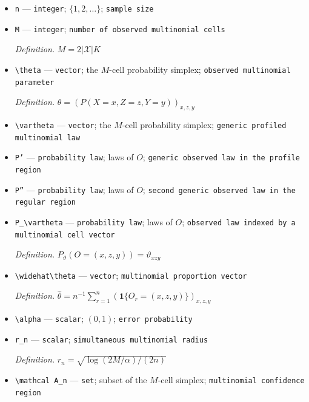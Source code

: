 \documentclass{article}
\begin{document}
\begin{itemize}
  \par\smallskip\noindent\emph{Definition.} \(H_\tau(v)=-A^2/v^2+B^2/(1-\tau-v)^2+2(v+\tau-D_0)/\tau-1\)
  \item \texttt{n} --- \texttt{integer}; \(\{1,2,\ldots\}\); \texttt{sample size}
  \item \texttt{M} --- \texttt{integer}; \texttt{number of observed multinomial cells}
  \par\smallskip\noindent\emph{Definition.} \(M=2|\mathcal X|K\)
  \item \texttt{\textbackslash{}\allowbreak{}theta} --- \texttt{vector}; the \(M\)-cell probability simplex; \texttt{observed multinomial parameter}
  \par\smallskip\noindent\emph{Definition.} \(\theta=(P(X=x,Z=z,Y=y))_{x,z,y}\)
  \item \texttt{\textbackslash{}\allowbreak{}vartheta} --- \texttt{vector}; the \(M\)-cell probability simplex; \texttt{generic profiled multinomial law}
  \item \texttt{P'} --- \texttt{probability law}; laws of \(O\); \texttt{generic observed law in the profile region}
  \item \texttt{P''} --- \texttt{probability law}; laws of \(O\); \texttt{second generic observed law in the regular region}
  \item \texttt{P\_\allowbreak{}\textbackslash{}\allowbreak{}vartheta} --- \texttt{probability law}; laws of \(O\); \texttt{observed law indexed by a multinomial cell vector}
  \par\smallskip\noindent\emph{Definition.} \(P_\vartheta(O=(x,z,y))=\vartheta_{xzy}\)
  \item \texttt{\textbackslash{}\allowbreak{}widehat\textbackslash{}\allowbreak{}theta} --- \texttt{vector}; \texttt{multinomial proportion vector}
  \par\smallskip\noindent\emph{Definition.} \(\widehat\theta=n^{-1}\sum_{r=1}^n(\mathbf 1\{O_r=(x,z,y)\})_{x,z,y}\)
  \item \texttt{\textbackslash{}\allowbreak{}alpha} --- \texttt{scalar}; \((0,1)\); \texttt{error probability}
  \item \texttt{r\_\allowbreak{}n} --- \texttt{scalar}; \texttt{simultaneous multinomial radius}
  \par\smallskip\noindent\emph{Definition.} \(r_n=\sqrt{\log(2M/\alpha)/(2n)}\)
  \item \texttt{\textbackslash{}\allowbreak{}mathcal A\_\allowbreak{}n} --- \texttt{set}; subset of the \(M\)-cell simplex; \texttt{multinomial confidence region}

\end{itemize}
\end{document}
